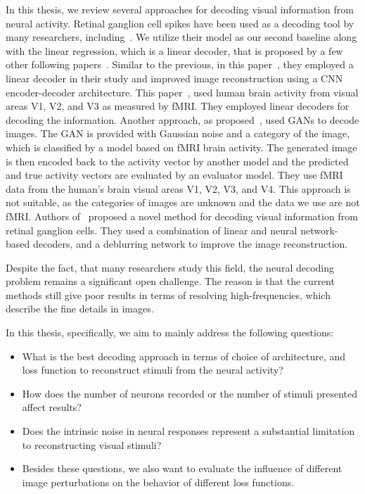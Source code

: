 In this thesis, we review several approaches for decoding visual information from neural activity. Retinal ganglion cell spikes have been used as a decoding tool by many researchers, including~\citep{zhang2020reconstruction}. We utilize their model as our second baseline along with the linear regression, which is a linear decoder, that is proposed by a few other following papers~\citep{Parthasarathy153759, kay2008identifying, kim2021nonlinear}.
Similar to the previous, in this paper~\citep{Parthasarathy153759}, they employed a linear decoder in their study and improved image reconstruction using a CNN encoder-decoder architecture.
This paper~\citep{kay2008identifying}, used human brain activity from visual areas V1, V2, and V3 as measured by fMRI. They employed linear decoders for decoding the information.
Another approach, as proposed~\citep{qiao2020biggan}, used GANs to decode images. The GAN is provided with Gaussian noise and a category of the image, which is classified by a model based on fMRI brain activity. The generated image is then encoded back to the activity vector by another model and the predicted and true activity vectors are evaluated by an evaluator model. They use fMRI data from the human's brain visual areas V1, V2, V3, and V4. This approach is not suitable, as the categories of images are unknown and the data we use are not fMRI.
Authors of~\citep{kim2021nonlinear} proposed a novel method for decoding visual information from retinal ganglion cells. They used a combination of linear and neural network-based decoders, and a deblurring network to improve the image reconstruction.

Despite the fact, that many researchers study this field, the neural decoding problem remains a significant open challenge. The reason is that the current methods still give poor results in terms of resolving high-frequencies, which describe the fine details in images.

In this thesis, specifically, we aim to mainly address the following questions:

\begin{itemize}
    \item What is the best decoding approach in terms of choice of architecture, and loss function to reconstruct stimuli from the neural activity?
    \item How does the number of neurons recorded or the number of stimuli presented affect results?
    \item Does the intrinsic noise in neural responses represent a substantial limitation to reconstructing visual stimuli?
    \item Besides these questions, we also want to evaluate the influence of different image perturbations on the behavior of different loss functions. 
\end{itemize}


